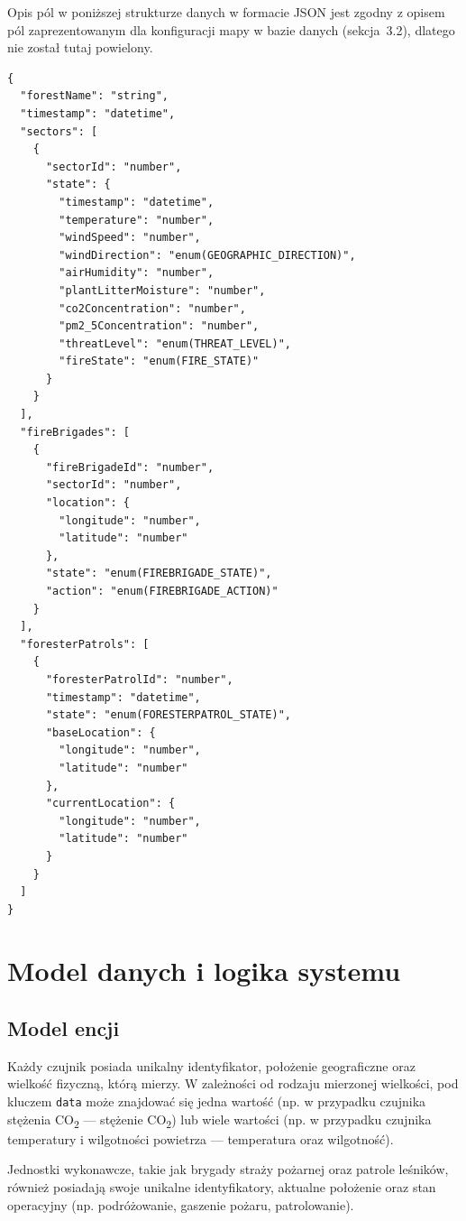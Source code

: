 \documentclass[11pt,a4paper]{article}
\begin{document}
Opis pól w poniższej strukturze danych w formacie JSON jest zgodny z opisem pól zaprezentowanym dla konfiguracji mapy w bazie danych (sekcja~3.2), dlatego nie został tutaj powielony.

\begin{verbatim}
{
  "forestName": "string",
  "timestamp": "datetime",
  "sectors": [
    {
      "sectorId": "number",
      "state": {
        "timestamp": "datetime",
        "temperature": "number",
        "windSpeed": "number",
        "windDirection": "enum(GEOGRAPHIC_DIRECTION)",
        "airHumidity": "number",
        "plantLitterMoisture": "number",
        "co2Concentration": "number",
        "pm2_5Concentration": "number",
        "threatLevel": "enum(THREAT_LEVEL)",
        "fireState": "enum(FIRE_STATE)"
      }
    }
  ],
  "fireBrigades": [
    {
      "fireBrigadeId": "number",
      "sectorId": "number",
      "location": {
        "longitude": "number",
        "latitude": "number"
      },
      "state": "enum(FIREBRIGADE_STATE)",
      "action": "enum(FIREBRIGADE_ACTION)"
    }
  ],
  "foresterPatrols": [
    {
      "foresterPatrolId": "number",
      "timestamp": "datetime",
      "state": "enum(FORESTERPATROL_STATE)",
      "baseLocation": {
        "longitude": "number",
        "latitude": "number"
      },
      "currentLocation": {
        "longitude": "number",
        "latitude": "number"
      }
    }
  ]
}
\end{verbatim}

\section{Model danych i logika systemu}

\subsection{Model encji}

Każdy czujnik posiada unikalny identyfikator, położenie geograficzne oraz wielkość fizyczną, którą mierzy. W zależności od rodzaju mierzonej wielkości, pod kluczem \texttt{data} może znajdować się jedna wartość (np. w przypadku czujnika stężenia CO\textsubscript{2} — stężenie CO\textsubscript{2}) lub wiele wartości (np. w przypadku czujnika temperatury i wilgotności powietrza — temperatura oraz wilgotność).

Jednostki wykonawcze, takie jak brygady straży pożarnej oraz patrole leśników, również posiadają swoje unikalne identyfikatory, aktualne położenie oraz stan operacyjny (np. podróżowanie, gaszenie pożaru, patrolowanie).
\end{document}
